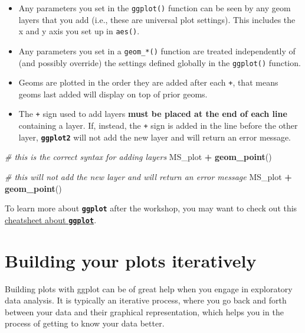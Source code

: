 \documentclass[]{book}
\newenvironment{Shaded}{\begin{snugshade}}{\end{snugshade}}
\newcommand{\KeywordTok}[1]{\textcolor[rgb]{0.13,0.29,0.53}{\textbf{#1}}}
\newcommand{\StringTok}[1]{\textcolor[rgb]{0.31,0.60,0.02}{#1}}
\newcommand{\CommentTok}[1]{\textcolor[rgb]{0.56,0.35,0.01}{\textit{#1}}}
\newcommand{\OperatorTok}[1]{\textcolor[rgb]{0.81,0.36,0.00}{\textbf{#1}}}
\newcommand{\NormalTok}[1]{#1}
\providecommand{\tightlist}{%
  \setlength{\itemsep}{0pt}\setlength{\parskip}{0pt}}
\theoremstyle{definition}
\theoremstyle{definition}
\theoremstyle{definition}
\theoremstyle{remark}
\begin{document}
\begin{itemize}
\tightlist
\item
  Any parameters you set in the \texttt{ggplot()} function can be seen
  by any geom layers that you add (i.e., these are universal plot
  settings). This includes the x and y axis you set up in
  \texttt{aes()}.
\item
  Any parameters you set in a \texttt{geom\_*()} function are treated
  independently of (and possibly override) the settings defined globally
  in the \texttt{ggplot()} function.
\item
  Geoms are plotted in the order they are added after each \texttt{+},
  that means geoms last added will display on top of prior geoms.
\item
  The \texttt{+} sign used to add layers \textbf{must be placed at the
  end of each line} containing a layer. If, instead, the \texttt{+} sign
  is added in the line before the other layer, \textbf{\texttt{ggplot2}}
  will not add the new layer and will return an error message.
\end{itemize}

\begin{Shaded}
\begin{Highlighting}[]
\CommentTok{# this is the correct syntax for adding layers}
\NormalTok{MS_plot }\OperatorTok{+}
\StringTok{  }\KeywordTok{geom_point}\NormalTok{()}

\CommentTok{# this will not add the new layer and will return an error message}
\NormalTok{MS_plot}
  \OperatorTok{+}\StringTok{ }\KeywordTok{geom_point}\NormalTok{()}
\end{Highlighting}
\end{Shaded}

To learn more about \textbf{\texttt{ggplot}} after the workshop, you may
want to check out this
\href{https://www.rstudio.com/wp-content/uploads/2016/11/ggplot2-cheatsheet-2.1.pdf}{cheatsheet
about \textbf{\texttt{ggplot}}}.

\section{Building your plots
iteratively}\label{building-your-plots-iteratively}

Building plots with ggplot can be of great help when you engage in
exploratory data analysis. It is typically an iterative process, where
you go back and forth between your data and their graphical
representation, which helps you in the process of getting to know your
data better.
\end{document}
